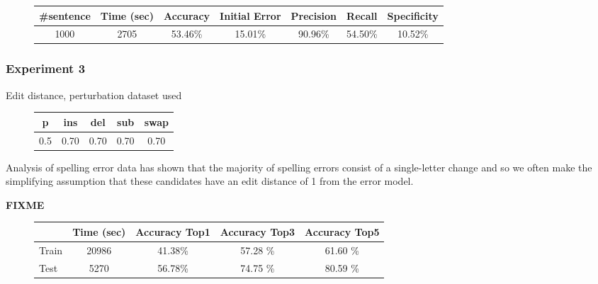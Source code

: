 \begin{figure}[H]
	\centering
	\begin{tabular}{ccccccc}
		\toprule
		\#sentence & Time (sec)  & Accuracy & Initial Error  &  Precision & Recall & Specificity \\
		\midrule
		\num{1000}	& \num{2705}  & \num{53,46}\%  & \num{15,01}\% & \num{90,96}\% & \num{54,50}\%  & 
		\num{10,52}\%  
		\\
		\bottomrule
	\end{tabular}
	\label{tab:sentence-eval2}
\end{figure}

\subsubsection{Experiment 3}

Edit distance, perturbation dataset used

\begin{figure}[H]
	\centering
	\begin{tabular}{ccccc}
		\toprule
		p 				 & ins 				 	& del  				&  sub 			   &   swap\\ \midrule
		\num{0.5} & \num{0,70} & \num{0,70}  & \num{0,70} & \num{0,70}\\
		\bottomrule
	\end{tabular}
	\label{tab:error_model3}
\end{figure}

Analysis of spelling error data has shown that the majority of spelling errors consist of a single-letter change and 
so we often make the simplifying assumption that these candidates have an edit distance of 1 from the error 
model.

\textbf{FIXME}
\begin{figure}[H]
	\centering
	\begin{tabular}{lcccc}
		\toprule
		& Time (sec)  & Accuracy Top1 & Accuracy Top3  &  Accuracy Top5 \\
		\midrule
		Train & \num{20986} & \num{41,38}\%  & \num{57,28} \% & \num{61,60} \% \\
		Test &	\num{5270}  & \num{56,78}\%  & \num{74,75} \% & \num{80,59} \%  \\
		\bottomrule
	\end{tabular}
	\label{tab:typo-eval3}
\end{figure}

